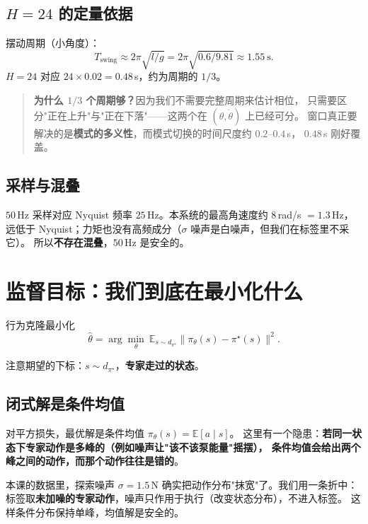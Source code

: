 \subsection{$H=24$ 的定量依据}

摆动周期（小角度）：
\begin{equation}
  T_{\text{swing}}\approx 2\pi\sqrt{l/g}=2\pi\sqrt{0.6/9.81}\approx1.55\ \mathrm{s}.
\end{equation}
$H=24$ 对应 $24\times0.02=0.48$\,s，约为周期的 $1/3$。

\begin{quote}
\textbf{为什么 $1/3$ 个周期够？}因为我们不需要完整周期来估计相位，
只需要区分"正在上升"与"正在下落"——这两个在 $(\theta,\dot\theta)$ 上已经可分。
窗口真正要解决的是\textbf{模式的多义性}，而模式切换的时间尺度约 $0.2$--$0.4$\,s，
$0.48$\,s 刚好覆盖。
\end{quote}

\subsection{采样与混叠}

$50$\,Hz 采样对应 Nyquist 频率 $25$\,Hz。本系统的最高角速度约 $8$\,rad/s $=1.3$\,Hz，
远低于 Nyquist；力矩也没有高频成分（$\sigma$ 噪声是白噪声，但我们在标签里不采它）。
所以\textbf{不存在混叠}，$50$\,Hz 是安全的。

\section{监督目标：我们到底在最小化什么}

行为克隆最小化
\begin{equation}
  \hat\theta=\arg\min_\theta\ \mathbb{E}_{s\sim d_{\pi^\star}}
  \big\|\pi_\theta(s)-\pi^\star(s)\big\|^2 .
  \label{eq:bc}
\end{equation}

注意期望的下标：$s\sim d_{\pi^\star}$，\textbf{专家走过的状态}。

\subsection{闭式解是条件均值}

对平方损失，最优解是条件均值 $\pi_\theta(s)=\mathbb{E}[a\mid s]$。
这里有一个隐患：\textbf{若同一状态下专家动作是多峰的（例如噪声让"该不该泵能量"摇摆），
条件均值会给出两个峰之间的动作，而那个动作往往是错的}。

本课的数据里，探索噪声 $\sigma=1.5$\,N 确实把动作分布"抹宽"了。我们用一条折中：
标签取\textbf{未加噪的专家动作}，噪声只作用于执行（改变状态分布），不进入标签。
这样条件分布保持单峰，均值解是安全的。

